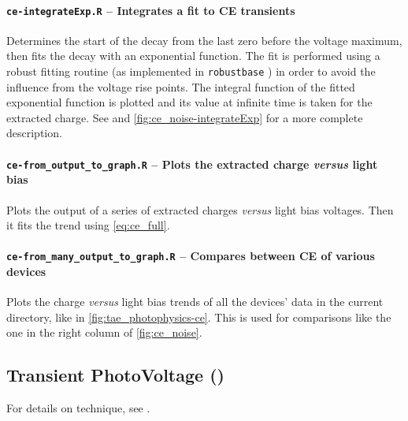 		\paragraph{\texttt{ce-\-integrateExp.R} -- Integrates a fit to CE transients}
		Determines the start of the  decay from the last zero before the voltage maximum, then fits the decay with an exponential function.
		The fit is performed using a robust fitting routine (as implemented in \texttt{robust\-base} \cite{Maechler2018}) in order to avoid the influence from the voltage rise points.
		The integral function of the fitted exponential function is plotted and its value at infinite time is taken for the extracted charge.
		See  and \cref{fig:ce_noise-integrateExp} for a more complete description.

		\paragraph{\texttt{ce-\-from\_output\_to\_graph.R} -- Plots the extracted charge \textsl{versus} light bias}
		Plots the output of a series of extracted charges \textsl{versus} light bias voltages.
		Then it fits the trend using \cref{eq:ce_full}.

		\paragraph{\texttt{ce-\-from\_many\_output\_to\_graph.R} -- Compares between CE of various devices}
		Plots the charge \textsl{versus} light bias trends of all the devices' data in the current directory, like in \cref{fig:tae_photophysics-ce}.
		This is used for comparisons like the one in the right column of \cref{fig:ce_noise}.


	\subsection{Transient PhotoVoltage ()}\label{r_tpv}
		For details on  technique, see .

